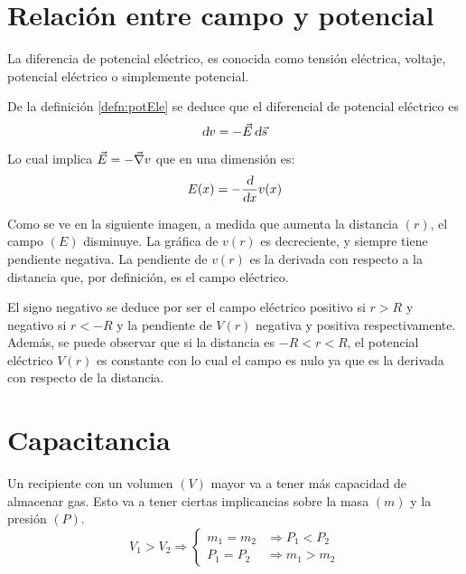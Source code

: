 \documentclass[a5paper,12pt,twoside]{book}
\begin{document}
\section{Relación entre campo y potencial}

La diferencia de potencial eléctrico, es conocida como tensión eléctrica, voltaje, potencial eléctrico o simplemente potencial.

De la definición \ref{defn:potEle} se deduce que el diferencial de potencial eléctrico es
\begin{equation*}
    \textsl{d} v = - \Vec{E} \, \textsl{d} \Vec{s}
\end{equation*}

Lo cual implica $\Vec{E} = - \Vec{\nabla} v$ que en una dimensión es:
\begin{equation*}
    E(x) = - \frac{\textsl{d}}{\textsl{d} x} v(x)
\end{equation*}

Como se ve en la siguiente imagen, a medida que aumenta la distancia $(r)$, el campo $(E)$ disminuye.
La gráfica de $v(r)$ es decreciente, y siempre tiene pendiente negativa.
La pendiente de $v(r)$ es la derivada con respecto a la distancia que, por definición, es el campo eléctrico.

\begin{center}
    \def\svgwidth{0.8\linewidth}
    
\end{center}

El signo negativo se deduce por ser el campo eléctrico positivo si $r>R$ y negativo si $r<-R$ y la pendiente de $V(r)$ negativa y positiva respectivamente. Además, se puede observar que si la distancia es $-R<r<R$, el potencial eléctrico $V(r)$ es constante con lo cual el campo es nulo ya que es la derivada con respecto de la distancia.


\section{Capacitancia}

Un recipiente con un volumen $(V)$ mayor va a tener más capacidad de almacenar gas. Esto va a tener ciertas implicancias sobre la masa $(m)$ y la presión $(P)$.
\begin{equation*}
    V_1 > V_2 \Rightarrow
    \left\{
    \begin{aligned}
        m_1 = m_2 & \Rightarrow P_1 < P_2
        \\
        P_1 = P_2 & \Rightarrow m_1 > m_2
    \end{aligned}
    \right.
\end{equation*}
\end{document}
